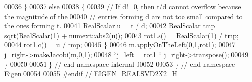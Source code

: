 \begin{DoxyCode}
00036   \}
00037   \textcolor{keywordflow}{else}
00038   \{
00039     \textcolor{comment}{// If d!=0, then t/d cannot overflow because the magnitude of the}
00040     \textcolor{comment}{// entries forming d are not too small compared to the ones forming t.}
00041     RealScalar u = t / d;
00042     RealScalar tmp = sqrt(RealScalar(1) + numext::abs2(u));
00043     rot1.s() = RealScalar(1) / tmp;
00044     rot1.c() = u / tmp;
00045   \}
00046   m.applyOnTheLeft(0,1,rot1);
00047   j\_right->makeJacobi(m,0,1);
00048   *j\_left = rot1 * j\_right->transpose();
00049 \}
00050 
00051 \} \textcolor{comment}{// end namespace internal}
00052 
00053 \} \textcolor{comment}{// end namespace Eigen}
00054 
00055 \textcolor{preprocessor}{#endif // EIGEN\_REALSVD2X2\_H}
\end{DoxyCode}
